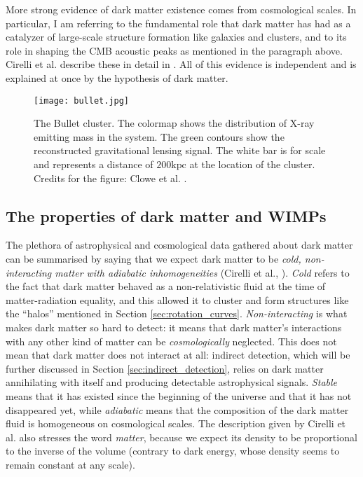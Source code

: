 More strong evidence of dark matter existence comes from cosmological scales. In particular, I am referring to the fundamental role that dark matter has had as a catalyzer of large-scale structure formation like galaxies and clusters, and to its role in shaping the CMB acoustic peaks as mentioned in the paragraph above. Cirelli et al. describe these in detail in \cite[Section 1.3]{Cirelli_2024}. All of this evidence is independent and is explained at once by the hypothesis of dark matter.

\begin{figure}[!ht]
	\centering
	\texttt{[image: bullet.jpg]}
	\caption{The Bullet cluster. The colormap shows the distribution of X-ray emitting mass in the system. The green contours show the reconstructed gravitational lensing signal. The white bar is for scale and represents a distance of \(200 \mathrm{kpc} \) at the location of the cluster. Credits for the figure: Clowe et al. \cite{Clowe_2006}.}
	\label{fig:bullet}
\end{figure}

\subsection{The properties of dark matter and WIMPs}

The plethora of astrophysical and cosmological data gathered about dark matter can be summarised by saying that we expect dark matter to be \emph{cold, non-interacting matter with adiabatic inhomogeneities} (Cirelli et al., \cite[Chapter 1]{Cirelli_2024}). \emph{Cold} refers to the fact that dark matter behaved as a non-relativistic fluid at the time of matter-radiation equality, and this allowed it to cluster and form structures like the ``halos'' mentioned in Section \ref{sec:rotation_curves}. \emph{Non-interacting} is what makes dark matter so hard to detect: it means that dark matter's interactions with any other kind of matter can be \emph{cosmologically} neglected. This does not mean that dark matter does not interact at all: indirect detection, which will be further discussed in Section \ref{sec:indirect_detection}, relies on dark matter annihilating with itself and producing detectable astrophysical signals. \emph{Stable} means that it has existed since the beginning of the universe and that it has not disappeared yet, while \emph{adiabatic} means that the composition of the dark matter fluid is homogeneous on cosmological scales. The description given by Cirelli et al. also stresses the word \emph{matter}, because we expect its density to be proportional to the inverse of the volume (contrary to dark energy, whose density seems to remain constant at any scale).

